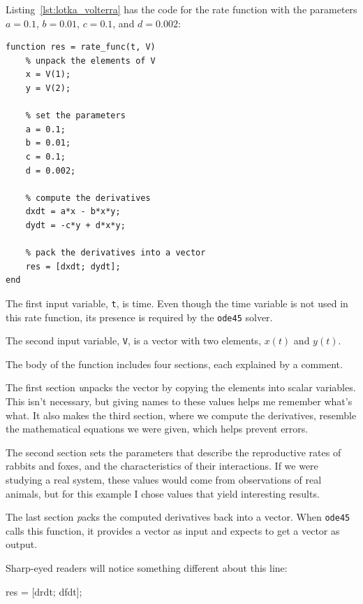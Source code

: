 Listing~\ref{lst:lotka_volterra} has the code for the rate function
with the parameters $a = 0.1$, $b = 0.01$, $c = 0.1$, 
and $d = 0.002$:

\begin{lstlisting}[caption={A rate function for Lotka-Volterra}, label={lst:lotka_volterra}]
function res = rate_func(t, V)
    % unpack the elements of V
    x = V(1);
    y = V(2);

    % set the parameters
    a = 0.1;
    b = 0.01;
    c = 0.1;
    d = 0.002;

    % compute the derivatives
    dxdt = a*x - b*x*y;
    dydt = -c*y + d*x*y;

    % pack the derivatives into a vector
    res = [dxdt; dydt];
end
\end{lstlisting}

The first input variable, {\tt t}, is time.
Even though the time variable is not used in this rate function, its presence is required by the {\tt ode45} solver.

The second input variable, {\tt V}, is a vector with two elements,
$x(t)$ and $y(t)$.

The body of the function includes four sections,
each explained by a comment.

The first section {\emph unpacks} the vector by copying the elements
into scalar variables.  This isn't necessary, but giving names to
these values helps me remember what's what.  It also makes the third
section, where we compute the derivatives, resemble the mathematical
equations we were given, which helps prevent errors.


The second section sets the parameters that describe the
reproductive rates of rabbits and foxes, and the characteristics of
their interactions.  If we were studying a real system, these values
would come from observations of real animals, but for this example
I chose values that yield interesting results.


The last section {\emph packs} the computed derivatives back into a
vector.  When {\tt ode45} calls this function, it provides a vector
as input and expects to get a vector as output.

Sharp-eyed readers will notice something different about this line:

\begin{code}
    res = [drdt; dfdt];
\end{code}

